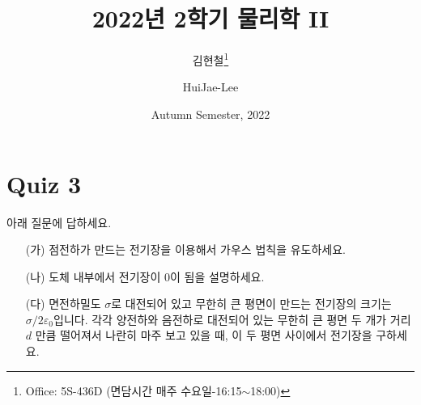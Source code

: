 \documentclass[tightenlines,floatfix,nofootinbib,superscriptaddress,fleqn]{revtex4-2}
\begin{document}
\title{\Large 2022년 2학기 물리학 II}
\author{김현철\footnote{Office: 5S-436D (면담시간 매주
    수요일-16:15$\sim$18:00)}} 
  \author{HuiJae-Lee} 
\date{Autumn Semester, 2022}

\maketitle



\section*{\large Quiz 3}
 아래 질문에 답하세요.
\begin{itemize}
\item[(가)] 점전하가 만드는 전기장을 이용해서 가우스 법칙을 유도하세요.
\item[(나)] 도체 내부에서 전기장이 0이 됨을 설명하세요.
\item[(다)] 면전하밀도 $\sigma$로 대전되어 있고 무한히 큰 평면이 
  만드는 전기장의 크기는 $\sigma/2\varepsilon_0$입니다. 각각 양전하와
  음전하로 대전되어 있는 무한히 큰 평면 두 개가 거리 $d$ 만큼 떨어져서
  나란히 마주 보고 있을 때, 이 두 평면 사이에서 전기장을 구하세요. 
\end{itemize}
\vspace{0.5cm}
\end{document}
